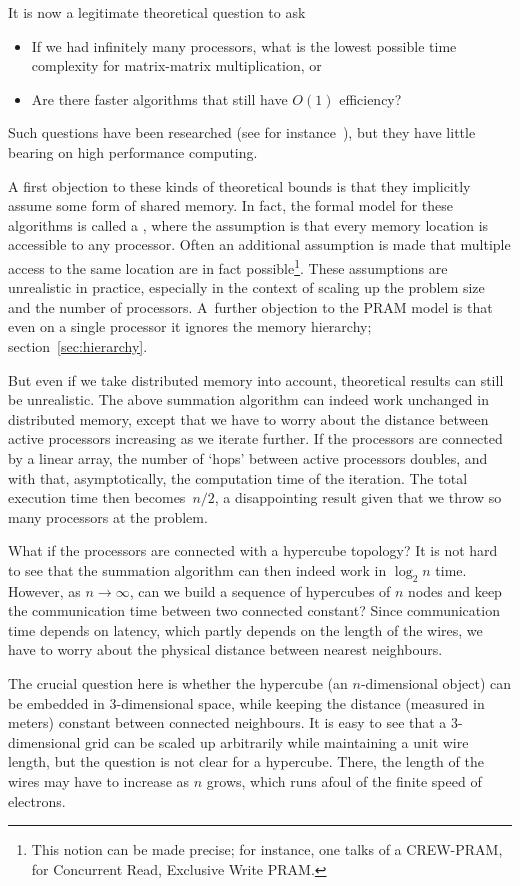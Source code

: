 It is now a legitimate theoretical question to ask
\begin{itemize}
\item If we had infinitely many processors, what is the lowest
  possible time complexity for matrix-matrix multiplication, or
\item Are there faster algorithms that still have $O(1)$ efficiency?
\end{itemize}
Such questions have been researched (see for
instance~\cite{He:surveyparallel}), but they have little bearing on
high performance computing. 

A first objection to these kinds of theoretical bounds is that they
implicitly assume some form of shared memory. In fact, the formal
model for these algorithms is called a , where the
assumption is that every memory location is accessible to any
processor.  Often an additional assumption is made that multiple
access to the same location are in fact possible\footnote{This notion
  can be made precise; for instance, one talks of a CREW-PRAM, for
  Concurrent Read, Exclusive Write PRAM.}. These assumptions are
unrealistic in practice, especially in the context of scaling up the
problem size and the number of processors. A~further objection to the
\ac{PRAM} model is that even on a single processor it ignores the
memory hierarchy; section~\ref{sec:hierarchy}.

But even if we take distributed memory into account, theoretical
results can still be unrealistic. The above summation algorithm can
indeed work unchanged in distributed memory, except that we have to
worry about the distance between active processors increasing as we
iterate further. If the processors are connected by a linear array,
the number of `hops' between active processors doubles, and with that,
asymptotically, the computation time of the iteration. The total
execution time then becomes~$n/2$, a disappointing result given that
we throw so many processors at the problem. 

What if the processors are
connected with a hypercube topology? It is not hard to see that the
summation algorithm can then indeed work in $\log_2n$ time. However,
as $n\rightarrow\infty$, can we build a sequence of hypercubes of $n$ nodes
and keep the communication time between two connected constant? Since
communication time depends on latency, which partly depends on the
length of the wires, we have to worry about the physical distance
between nearest neighbours.

The crucial question here is whether the hypercube (an $n$-dimensional
object) can be embedded in 3-dimensional space, while keeping the
distance (measured in meters) constant between connected neighbours.
It is easy to see that a 3-dimensional grid can be scaled up
arbitrarily while maintaining a unit wire length, but the question is
not clear for a hypercube.  There, the length of the wires may have to
increase as $n$ grows, which runs afoul of the finite speed of
electrons.

